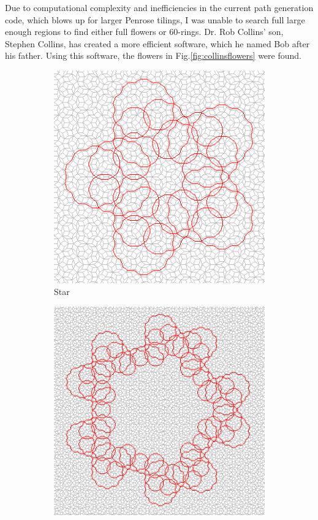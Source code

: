\documentclass[
  oneside,
  11pt, a4paper,
  footinclude=true,
  headinclude=true,
  cleardoublepage=empty
]{scrbook}
\begin{document}
Due to computational complexity and inefficiencies in the current path generation code, which blows up for larger Penrose tilings, I was unable to search full large enough regions to find either full flowers or 60-rings. Dr. Rob Collins' son, Stephen Collins, has created a more efficient software, which he named Bob after his father. Using this software, the flowers in Fig.\ref{fig:collinsflowers} were found.
\begin{figure}[H]
\centering
\begin{subfigure}[b]{0.45\textwidth}
\includegraphics[width=\textwidth]{Star}
\caption[Star]{Star}
\end{subfigure}\hfill
\begin{subfigure}[b]{0.45\textwidth}
\includegraphics[width=\textwidth]{Pentagon}

\end{subfigure}
\end{figure}
\end{document}
